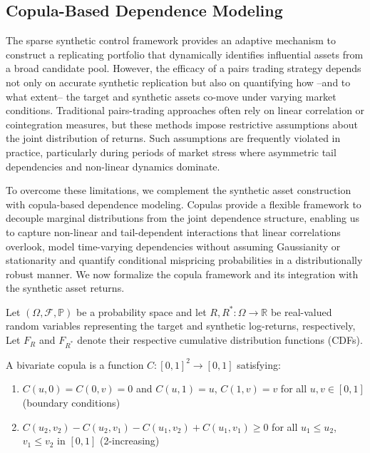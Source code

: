 \subsection{Copula-Based Dependence Modeling}

The sparse synthetic control framework provides an adaptive mechanism to construct a replicating portfolio that dynamically identifies influential assets from a broad candidate pool. However, the efficacy of a pairs trading strategy depends not only on accurate synthetic replication but also on quantifying how --and to what extent-- the target and synthetic assets co-move under varying market conditions. 
%
Traditional pairs-trading approaches often rely on linear correlation or cointegration measures, but these methods impose restrictive assumptions about the joint distribution of returns. Such assumptions are frequently violated in practice, particularly during periods of market stress where asymmetric tail dependencies and non-linear dynamics dominate.

To overcome these limitations, we complement the synthetic asset construction with copula-based dependence modeling. Copulas provide a flexible framework to decouple marginal distributions from the joint dependence structure, enabling us to capture non-linear and tail-dependent interactions that linear correlations overlook, model time-varying dependencies without assuming Gaussianity or stationarity and quantify conditional mispricing probabilities in a distributionally robust manner.
%
We now formalize the copula framework and its integration with the synthetic asset returns.

Let $(\Omega, \mathcal{F}, \mathbb{P})$ be a probability space and let $R, R^*: \Omega \to \mathbb{R}$ be real-valued random variables representing the target and synthetic log-returns, respectively, 
Let $F_R$ and $F_{R^*}$ denote their respective cumulative distribution functions (CDFs).

\begin{definition}
A bivariate copula is a function $C: [0,1]^2 \to [0,1]$ satisfying:
\begin{enumerate}
   \item $C(u,0) = C(0,v) = 0$ and $C(u,1) = u$, $C(1,v) = v$ for all $u,v \in [0,1]$ (boundary conditions)
   \item $C(u_2,v_2) - C(u_2,v_1) - C(u_1,v_2) + C(u_1,v_1) \geq 0$ for all $u_1 \leq u_2$, $v_1 \leq v_2$ in $[0,1]$ (2-increasing)
\end{enumerate}
\end{definition}

